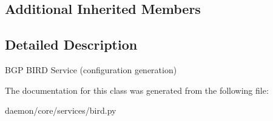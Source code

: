 \subsection*{Additional Inherited Members}


\subsection{Detailed Description}
\begin{DoxyVerb}BGP BIRD Service (configuration generation)\end{DoxyVerb}
 

The documentation for this class was generated from the following file\+:\begin{DoxyCompactItemize}
\item 
daemon/core/services/bird.\+py\end{DoxyCompactItemize}
